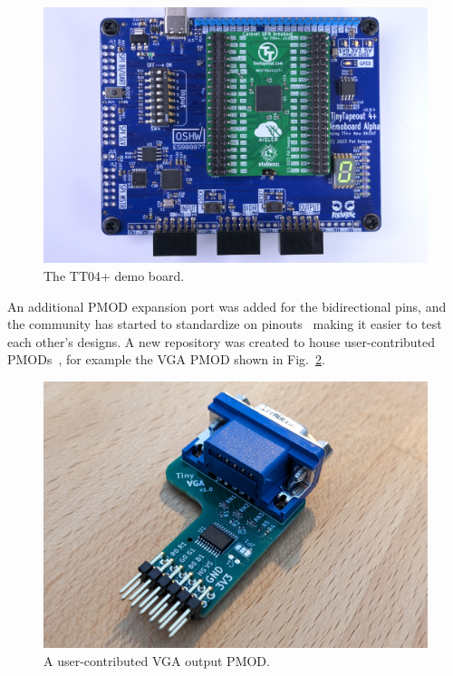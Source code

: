 \begin{figure}[htp]
\centering
\includegraphics[width=\columnwidth]{./Figs/tt04-demoboard-top.jpg}
\caption{The TT04+ demo board\cite{tt04demoboard}.}
\label{fig:TT04plus_demo_board}
\end{figure}

An additional PMOD expansion port was added for the bidirectional pins, and the community has started to standardize on pinouts~\cite{pinouts} making it easier to test each other's designs.
A new repository was created to house user-contributed PMODs~\cite{awesomepmods}, for example the VGA PMOD shown in Fig.~\ref{fig:user_contributed_VGA_PMOD}.

\begin{figure}[htp]
\centering
\includegraphics[width=\columnwidth]{./Figs/tiny_vga_pmod.jpg}
\caption{A user-contributed VGA output PMOD.}
\label{fig:user_contributed_VGA_PMOD}
\end{figure}

